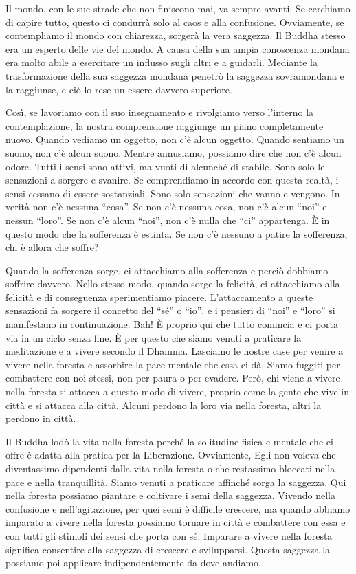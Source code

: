 Il mondo, con le sue strade che non finiscono mai, va sempre avanti. Se
cerchiamo di capire tutto, questo ci condurrà solo al caos e alla
confusione. Ovviamente, se contempliamo il mondo con chiarezza, sorgerà
la vera saggezza. Il Buddha stesso era un esperto delle vie del mondo. A
causa della sua ampia conoscenza mondana era molto abile a esercitare un
influsso sugli altri e a guidarli. Mediante la trasformazione della sua
saggezza mondana penetrò la saggezza sovramondana e la raggiunse, e ciò
lo rese un essere davvero superiore.

Così, se lavoriamo con il suo insegnamento e rivolgiamo verso l'interno
la contemplazione, la nostra comprensione raggiunge un piano
completamente nuovo. Quando vediamo un oggetto, non c'è alcun oggetto.
Quando sentiamo un suono, non c'è alcun suono. Mentre annusiamo,
possiamo dire che non c'è alcun odore. Tutti i sensi sono attivi, ma
vuoti di alcunché di stabile. Sono solo le sensazioni a sorgere e
svanire. Se comprendiamo in accordo con questa realtà, i sensi cessano
di essere sostanziali. Sono solo sensazioni che vanno e vengono. In
verità non c'è nessuna ``cosa''. Se non c'è nessuna cosa, non c'è alcun
``noi'' e nessun ``loro''. Se non c'è alcun ``noi'', non c'è nulla che
``ci'' appartenga. È in questo modo che la sofferenza è estinta. Se non
c'è nessuno a patire la sofferenza, chi è allora che soffre?

Quando la sofferenza sorge, ci attacchiamo alla sofferenza e perciò
dobbiamo soffrire davvero. Nello stesso modo, quando sorge la felicità,
ci attacchiamo alla felicità e di conseguenza sperimentiamo piacere.
L'attaccamento a queste sensazioni fa sorgere il concetto del ``sé'' o
``io'', e i pensieri di ``noi'' e ``loro'' si manifestano in
continuazione. Bah! È proprio qui che tutto comincia e ci porta via in
un ciclo senza fine. È per questo che siamo venuti a praticare la
meditazione e a vivere secondo il Dhamma. Lasciamo le nostre case per
venire a vivere nella foresta e assorbire la pace mentale che essa ci
dà. Siamo fuggiti per combattere con noi stessi, non per paura o per
evadere. Però, chi viene a vivere nella foresta si attacca a questo modo
di vivere, proprio come la gente che vive in città e si attacca alla
città. Alcuni perdono la loro via nella foresta, altri la perdono in
città.

Il Buddha lodò la vita nella foresta perché la solitudine fisica e
mentale che ci offre è adatta alla pratica per la Liberazione.
Ovviamente, Egli non voleva che diventassimo dipendenti dalla vita nella
foresta o che restassimo bloccati nella pace e nella tranquillità. Siamo
venuti a praticare affinché sorga la saggezza. Qui nella foresta
possiamo piantare e coltivare i semi della saggezza. Vivendo nella
confusione e nell'agitazione, per quei semi è difficile crescere, ma
quando abbiamo imparato a vivere nella foresta possiamo tornare in città
e combattere con essa e con tutti gli stimoli dei sensi che porta con
sé. Imparare a vivere nella foresta significa consentire alla saggezza
di crescere e svilupparsi. Questa saggezza la possiamo poi applicare
indipendentemente da dove andiamo.

